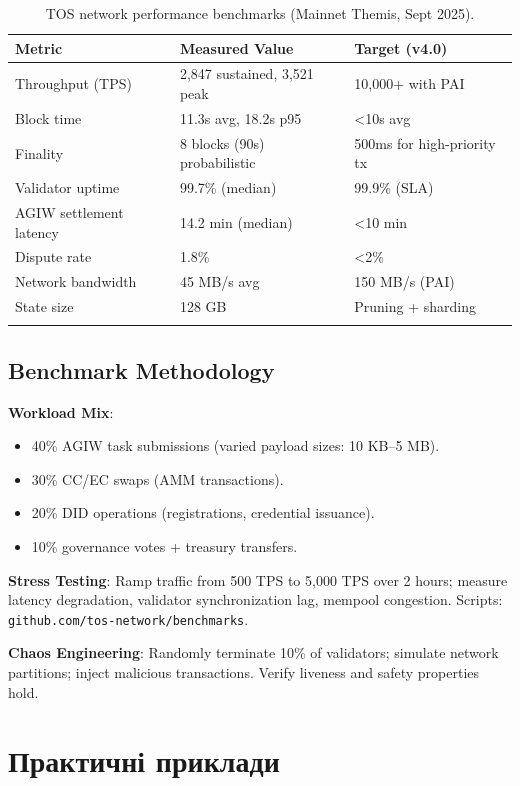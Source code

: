 \documentclass[11pt]{article}
\begin{document}
\begin{longtable}{@{}p{}p{}p{}@{}}
\toprule
\textbf{Metric} & \textbf{Measured Value} & \textbf{Target (v4.0)} \\\midrule
Throughput (TPS) & 2,847 sustained, 3,521 peak & 10,000+ with PAI \\
Block time & 11.3s avg, 18.2s p95 & <10s avg \\
Finality & 8 blocks (90s) probabilistic & 500ms for high-priority tx \\
Validator uptime & 99.7\% (median) & 99.9\% (SLA) \\
AGIW settlement latency & 14.2 min (median) & <10 min \\
Dispute rate & 1.8\% & <2\% \\
Network bandwidth & 45 MB/s avg & 150 MB/s (PAI) \\
State size & 128 GB & Pruning + sharding \\
\bottomrule
\caption{TOS network performance benchmarks (Mainnet Themis, Sept 2025).}
\end{longtable}

\subsection{Benchmark Methodology}

\textbf{Workload Mix}:
\begin{itemize}[noitemsep]
  \item 40\% AGIW task submissions (varied payload sizes: 10 KB--5 MB).
  \item 30\% CC/EC swaps (AMM transactions).
  \item 20\% DID operations (registrations, credential issuance).
  \item 10\% governance votes + treasury transfers.
\end{itemize}

\textbf{Stress Testing}: Ramp traffic from 500 TPS to 5,000 TPS over 2 hours; measure latency degradation, validator synchronization lag, mempool congestion. Scripts: \texttt{github.com/tos-network/benchmarks}.

\textbf{Chaos Engineering}: Randomly terminate 10\% of validators; simulate network partitions; inject malicious transactions. Verify liveness and safety properties hold.

\section{Практичні приклади}
\label{sec:case-studies}
\end{document}
